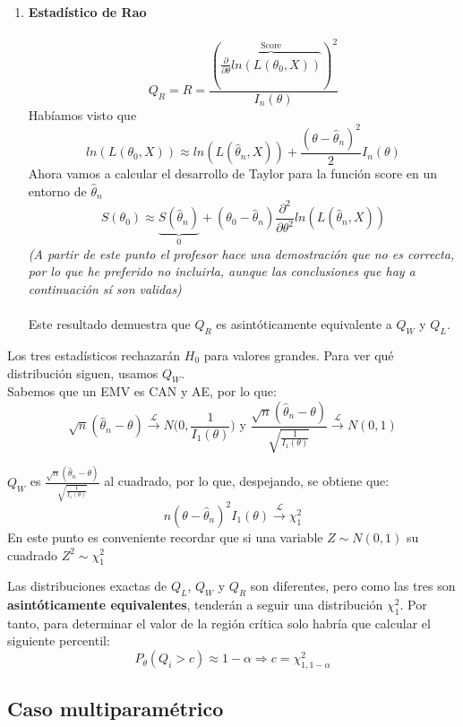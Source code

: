 \begin{enumerate}
    \item \textbf{Estadístico de Rao}\\\ \\
    $$Q_R=R=\frac{\left(\overbrace{\frac{\partial}{\partial\theta}ln(L(\theta_0,X))}^{\text{Score}}\right)^2}{I_n(\theta)}$$
    Habíamos visto que 
    $$ln(L(\theta_0,X))\approx ln(L(\widehat\theta_n,X))+\frac{(\theta-\widehat\theta_n)^2}{2}I_n(\theta)$$
    Ahora vamos a calcular el desarrollo de Taylor para la función score en un entorno de $\widehat\theta_n$
    $$S(\theta_0)\approx \underbrace{S(\widehat\theta_n)}_{0}+(\theta_0-\widehat\theta_n)\frac{\partial^2}{\partial\theta^2}ln(L(\widehat\theta_n,X))$$
    \textit{(A partir de este punto el profesor hace una demostración que no es correcta, por lo que he preferido no incluirla, aunque las conclusiones que hay a continuación sí son validas)}\\\ \\
    Este resultado demuestra que $Q_R$ es asintóticamente equivalente a $Q_W$ y $Q_L$. 
\end{enumerate}

Los tres estadísticos rechazarán $H_0$ para valores grandes. Para ver qué distribución siguen, usamos $Q_W$.\\
Sabemos que un EMV es CAN y AE, por lo que:
$$\sqrt{n}(\widehat\theta_n-\theta)\overset{\mathcal{L}}{\longrightarrow}N\Big(0,\frac{1}{I_1(\theta)}\Big)\text{ y }\frac{\sqrt{n}(\widehat\theta_n-\theta)}{\sqrt{\frac{1}{I_1(\theta)}}}\overset{\mathcal{L}}{\longrightarrow}N(0,1)$$

$Q_W$ es $\displaystyle\frac{\sqrt{n}(\widehat\theta_n-\theta)}{\sqrt{\frac{1}{I_1(\theta)}}}$ al cuadrado, por lo que, despejando, se obtiene que:
$$n(\theta-\widehat\theta_n)^2I_1(\theta)\overset{\mathcal{L}}{\longrightarrow}\chi^2_1$$
En este punto es conveniente recordar que si una variable $Z\sim N(0,1)$ su cuadrado $Z^2\sim \chi^2_1$

Las distribuciones exactas de $Q_L$, $Q_W$ y $Q_R$ son diferentes, pero como las tres son \textbf{asintóticamente equivalentes}, tenderán a seguir una distribución $\chi^2_1$. 
Por tanto, para determinar el valor de la región crítica solo habría que calcular el siguiente percentil:
$$P_{\theta}(Q_i>c)\approx 1-\alpha\Longrightarrow  c=\chi^2_{1,1-\alpha}$$

\subsection{Caso multiparamétrico}

